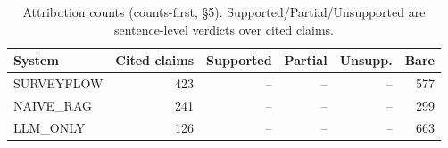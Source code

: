 \begin{table}[t]
\centering
\small
\caption{Attribution counts (counts-first, §5). Supported/Partial/Unsupported are sentence-level verdicts over cited claims.}
\label{tab:attribution-counts}
\begin{tabular}{lrrrrr}
\toprule
System & Cited claims & Supported & Partial & Unsupp. & Bare \\
\midrule
SURVEYFLOW & 423 & -- & -- & -- & 577 \\
NAIVE_RAG & 241 & -- & -- & -- & 299 \\
LLM_ONLY & 126 & -- & -- & -- & 663 \\
\bottomrule
\end{tabular}
\end{table}